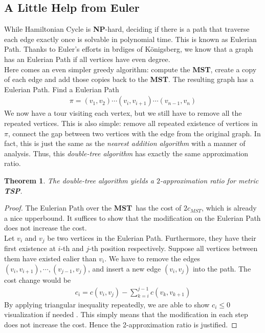 \documentclass[11pt,psfig,times]{article}
\newcommand*{\NP}{\textbf{NP}}
\newcommand*{\mst}{\textbf{MST}}
\newtheorem{theorem}{Theorem}
\begin{document}
\subsection{A Little Help from Euler}
While Hamiltonian Cycle is \NP-hard, deciding if there is a path that traverse each edge exactly once 
is solvable in polynomial time. This is known as Eulerian Path. Thanks to Euler's efforts 
in brdiges of K\"onigsberg, we know that a graph has an Eulerian Path if all vertices have even degree. \\
Here comes an even simpler greedy algorithm: compute the \mst, create a copy of each 
edge and add those copies back to the \mst. The resulting graph has a Eulerian Path. Find a Eulerian Path 
\begin{align*}
    \pi = (v_1, v_2)\cdots(v_i, v_{i+1})\cdots(v_{n-1}, v_n)    
\end{align*}
We now have a tour visiting each vertex, but we still have 
to remove all the repeated vertices. This is also simple: remove all repeated existence of vertices in $\pi$, 
connect the gap between two vertices with the edge from the original graph. In fact, this is just the same as 
the \textit{nearest addition algorithm} with a manner of analysis. Thus, this \textit{double-tree algorithm}
has exactly the same approximation ratio. 
\begin{theorem}
    The \textit{double-tree algorithm} yields a $2$-approximation ratio for metric \textbf{TSP}. 
    \label{theorem:double-tree}   
\end{theorem}
\begin{proof}
    The Eulerian Path over the \mst\ has the cost of $2c_{MST}$, which is already a nice upperbound. 
    It suffices to show that the modification on the Eulerian Path does not increase the cost. \\
    Let $v_i$ and $v_j$ be two vertices in the Eulerian Path. Furthermore, they have their first existence at $i$-th and $j$-th position respectively.
    Suppose all vertices between them have existed ealier than $v_i$. We have to remove the edges $(v_i, v_{i+1}), \cdots, (v_{j-1}, v_j)$, 
    and insert a new edge $(v_i, v_j)$ into the path. The cost change would be 
    \begin{align*}
        c_i = c(v_i, v_j) - \sum_{k = i}^{j-1} c(v_k, v_{k+1})
    \end{align*}
    By applying triangular inequality repeatedly, we are able to show $c_i \leq 0$ \color{red} visualization if needed \color{black}. 
    This simply means that the modification in each step does not increase the cost. Hence the 2-approximation ratio is justified.
\end{proof}
\end{document}
